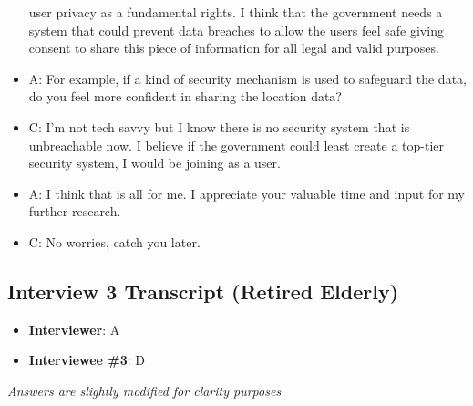 \begin{itemize}
    user privacy as a fundamental rights. I think that the government needs a system that could
    prevent data breaches to allow the users feel safe giving consent to share this piece of
    information for all legal and valid purposes.
    \item A: For example, if a kind of security mechanism is used to safeguard the data, do you feel more
    confident in sharing the location data?
    \item C: I’m not tech savvy but I know there is no security system that is unbreachable now. I believe
    if the government could least create a top-tier security system, I would be joining as a user.
    \item A: I think that is all for me. I appreciate your valuable time and input for my further research.
    \item C: No worries, catch you later.
  \end{itemize}

\subsection{Interview 3 Transcript (Retired Elderly)}
  \begin{itemize}
    \item \textbf{Interviewer}: A
    \item \textbf{Interviewee \#3}: D
  \end{itemize}
  \par \textit{Answers are slightly modified for clarity purposes}

